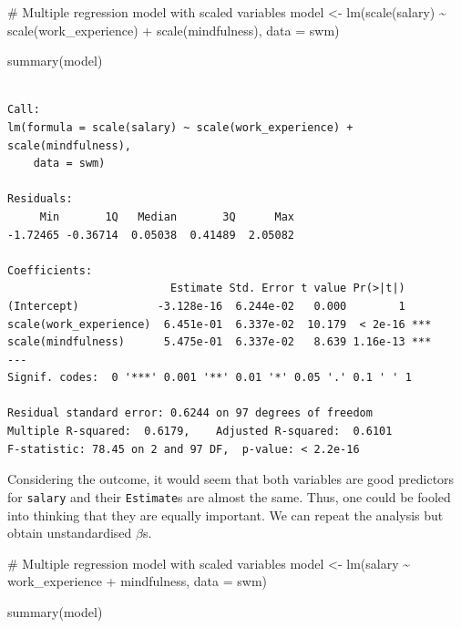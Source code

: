 \documentclass[
  letterpaper,
]{krantz}
\makeatletter
\newenvironment{Shaded}{\begin{snugshade}}{\end{snugshade}}
\newcommand{\AttributeTok}[1]{\textcolor[rgb]{0.40,0.45,0.13}{#1}}
\newcommand{\CommentTok}[1]{\textcolor[rgb]{0.37,0.37,0.37}{#1}}
\newcommand{\FunctionTok}[1]{\textcolor[rgb]{0.28,0.35,0.67}{#1}}
\newcommand{\NormalTok}[1]{\textcolor[rgb]{0.00,0.23,0.31}{#1}}
\newcommand{\OtherTok}[1]{\textcolor[rgb]{0.00,0.23,0.31}{#1}}
\newcommand{\SpecialCharTok}[1]{\textcolor[rgb]{0.37,0.37,0.37}{#1}}
\newenvironment{kframe}{%
\medskip{}
\setlength{\fboxsep}{.8em}
 \def\at@end@of@kframe{}%
 \ifinner\ifhmode%
  \def\at@end@of@kframe{\end{minipage}}%
  \begin{minipage}{\columnwidth}%
 \fi\fi%
 \def\FrameCommand##1{\hskip\@totalleftmargin \hskip-\fboxsep
 \colorbox{shadecolor}{##1}\hskip-\fboxsep
     \hskip-\linewidth \hskip-\@totalleftmargin \hskip\columnwidth}%
 \MakeFramed {\advance\hsize-\width
   \@totalleftmargin\z@ \linewidth\hsize
   \@setminipage}}%
 {\par\unskip\endMakeFramed%
 \at@end@of@kframe}
\renewenvironment{Shaded}{\begin{kframe}}{\end{kframe}}
\makeatother
\begin{document}
\begin{Shaded}
\begin{Highlighting}[]
\CommentTok{\# Multiple regression model with scaled variables}
\NormalTok{model }\OtherTok{\textless{}{-}} \FunctionTok{lm}\NormalTok{(}\FunctionTok{scale}\NormalTok{(salary) }\SpecialCharTok{\textasciitilde{}} \FunctionTok{scale}\NormalTok{(work\_experience) }\SpecialCharTok{+} \FunctionTok{scale}\NormalTok{(mindfulness),}
            \AttributeTok{data =}\NormalTok{ swm)}

\FunctionTok{summary}\NormalTok{(model)}
\end{Highlighting}
\end{Shaded}

\begin{verbatim}

Call:
lm(formula = scale(salary) ~ scale(work_experience) + scale(mindfulness), 
    data = swm)

Residuals:
     Min       1Q   Median       3Q      Max 
-1.72465 -0.36714  0.05038  0.41489  2.05082 

Coefficients:
                         Estimate Std. Error t value Pr(>|t|)    
(Intercept)            -3.128e-16  6.244e-02   0.000        1    
scale(work_experience)  6.451e-01  6.337e-02  10.179  < 2e-16 ***
scale(mindfulness)      5.475e-01  6.337e-02   8.639 1.16e-13 ***
---
Signif. codes:  0 '***' 0.001 '**' 0.01 '*' 0.05 '.' 0.1 ' ' 1

Residual standard error: 0.6244 on 97 degrees of freedom
Multiple R-squared:  0.6179,    Adjusted R-squared:  0.6101 
F-statistic: 78.45 on 2 and 97 DF,  p-value: < 2.2e-16
\end{verbatim}

Considering the outcome, it would seem that both variables are good
predictors for \texttt{salary} and their \texttt{Estimate}s are almost
the same. Thus, one could be fooled into thinking that they are equally
important. We can repeat the analysis but obtain unstandardised
\(\beta\)s.

\begin{Shaded}
\begin{Highlighting}[]
\CommentTok{\# Multiple regression model with scaled variables}
\NormalTok{model }\OtherTok{\textless{}{-}} \FunctionTok{lm}\NormalTok{(salary }\SpecialCharTok{\textasciitilde{}}\NormalTok{ work\_experience }\SpecialCharTok{+}\NormalTok{ mindfulness,}
            \AttributeTok{data =}\NormalTok{ swm)}

\FunctionTok{summary}\NormalTok{(model)}
\end{Highlighting}
\end{Shaded}
\end{document}
